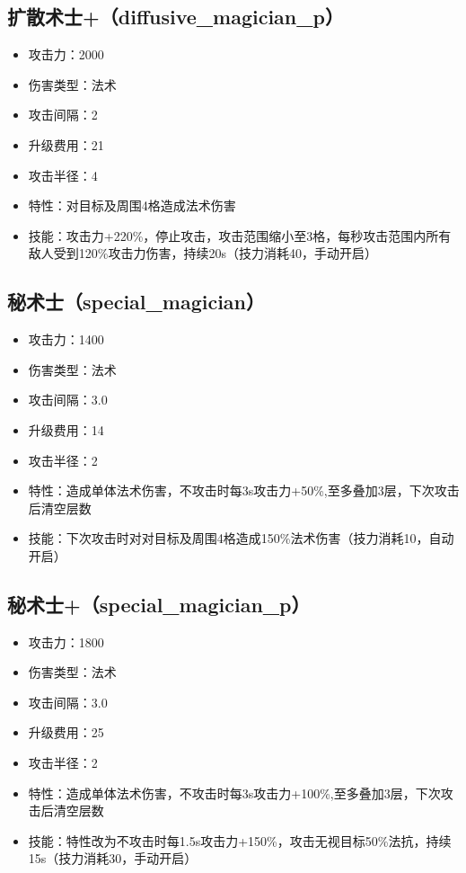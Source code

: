 		\subsection{扩散术士+（diffusive\_magician\_p）}
			\begin{itemize}
				\item 攻击力：2000
				\item 伤害类型：法术
				\item 攻击间隔：2
				\item 升级费用：21
				\item 攻击半径：4
				\item 特性：对目标及周围4格造成法术伤害
				\item 技能：攻击力+220\%，停止攻击，攻击范围缩小至3格，每秒攻击范围内所有敌人受到120\%攻击力伤害，持续20s（技力消耗40，手动开启）
			\end{itemize}
		\subsection{秘术士（special\_magician）}
			\begin{itemize}
				\item 攻击力：1400
				\item 伤害类型：法术
				\item 攻击间隔：3.0
				\item 升级费用：14
				\item 攻击半径：2
				\item 特性：造成单体法术伤害，不攻击时每3s攻击力+50\%,至多叠加3层，下次攻击后清空层数
				\item 技能：下次攻击时对对目标及周围4格造成150\%法术伤害（技力消耗10，自动开启）
			\end{itemize}
		\subsection{秘术士+（special\_magician\_p）}
			\begin{itemize}
				\item 攻击力：1800
				\item 伤害类型：法术
				\item 攻击间隔：3.0
				\item 升级费用：25
				\item 攻击半径：2
				\item 特性：造成单体法术伤害，不攻击时每3s攻击力+100\%,至多叠加3层，下次攻击后清空层数
				\item 技能：特性改为不攻击时每1.5s攻击力+150\%，攻击无视目标50\%法抗，持续15s（技力消耗30，手动开启）
			\end{itemize}
